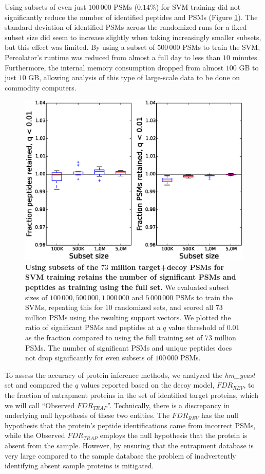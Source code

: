 \documentclass{article}
\begin{document}
Using subsets of even just $100\,000$ PSMs ($0.14\%$) for SVM training
did not significantly reduce the number of identified peptides and
PSMs (Figure \ref{fig:subset}). The standard deviation of identified
PSMs across the randomized runs for a fixed subset size did seem to
increase slightly when taking increasingly smaller subsets, but this
effect was limited. By using a subset of $500\,000$ PSMs to train the
SVM, Percolator’s runtime was reduced from almost a full day to less
than $10$ minutes. Furthermore, the internal memory consumption
dropped from almost $100$ GB to just $10$ GB, allowing analysis of
this type of large-scale data to be done on commodity computers.

\begin{figure}[!htp]
\begin{center}
\includegraphics[width=0.6\linewidth]{./img/subset-performance}
\caption{\label{fig:subset}\textbf{Using subsets of the $73$ million
target+decoy PSMs for SVM training retains the number of significant
PSMs and peptides as training using the full set.} We evaluated subset
sizes of $100\,000, 500\,000, 1\,000\,000$ and $5\,000\,000$ PSMs to
train the SVMs, repeating this for $10$ randomized sets, and scored
all $73$ million PSMs using the resulting support vectors. We plotted
the ratio of significant PSMs and peptides at a $q$ value threshold of
$0.01$ as the fraction compared to using the full training set of $73$
million PSMs. The number of significant PSMs and unique peptides does
not drop significantly for even subsets of $100\,000$ PSMs.}
\end{center}
\end{figure}

To assess the accuracy of protein inference methods, we analyzed the
{\em hm\_yeast} set and compared the $q$ values reported based on the
decoy model, $FDR_{REV}$, to the fraction of entrapment proteins in
the set of identified target proteins, which we will call ``Observed
$FDR_{TRAP}$''. Technically, there is a discrepancy in underlying null
hypothesis of these two entities. The $FDR_{REV}$ has the null
hypothesis that the protein's peptide identifications came from
incorrect PSMs, while the Observed $FDR_{TRAP}$ employs the null
hypothesis that the protein is absent from the sample. However, by
ensuring that the entrapment database is very large compared to the
sample database the problem of inadvertently identifying absent sample
proteins is mitigated. 
\end{document}

